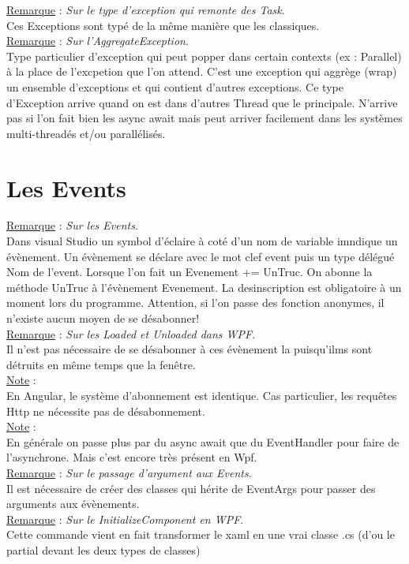 \documentclass[a4paper,12pt,twoside]{article}
\newcommand{\incode}[1]{{\footnotesize\ttfamily #1}} %
\newcommand{\rem}[2]{\noindent\underline{Remarque} : \textit{#1}.\\ \indent #2}
\newcommand{\note}[1]{\noindent\underline{Note} : \\ \indent #1}
\begin{document}
\rem{Sur le type d'exception qui remonte des Task}{Ces Exceptions sont typé de la même manière que les classiques.}\\

\rem{Sur l'\incode{AggregateException}}{Type particulier d'exception qui peut popper dans certain contexts (ex : Parallel) à la place de l'excpetion que l'on attend. C'est une exception qui aggrège (wrap) un ensemble d'exceptions et qui contient d'autres exceptions. Ce type d'Exception arrive quand on est dans d'autres Thread que le principale. N'arrive pas si l'on fait bien les async await mais peut arriver facilement dans les systèmes multi-threadés et/ou parallélisés.}\\

\section{Les Events}

\rem{Sur les Events}{Dans visual Studio un symbol d'éclaire à coté d'un nom de variable imndique un évènement. Un évènement se déclare avec le mot clef \incode{event} puis un type délégué Nom de l'event. Lorsque l'on fait un \incode{Evenement += UnTruc}. On abonne la méthode \incode{UnTruc} à l'évènement \incode{Evenement}. La desinscription est obligatoire à un moment lors du programme. Attention, si l'on passe des fonction anonymes, il n'existe aucun moyen de se désabonner!}\\

\rem{Sur les \incode{Loaded} et \incode{Unloaded} dans WPF}{Il n'est pas nécessaire de se désabonner à ces évènement la puisqu'ilms sont détruits en même temps que la fenêtre.}\\

\note{En Angular, le système d'abonnement est identique. Cas particulier, les requêtes Http ne nécessite pas de désabonnement.}\\

\note{En générale on passe plus par du \incode{async await} que du \incode{EventHandler} pour faire de l'asynchrone. Mais c'est encore très présent en Wpf.}\\

\rem{Sur le passage d'argument aux Events}{Il est nécessaire de créer des classes qui hérite de \incode{EventArgs} pour passer des arguments aux évènements.}\\

\rem{Sur le \incode{InitializeComponent} en WPF}{Cette commande vient en fait transformer le xaml en une vrai classe .cs (d'ou le \incode{partial} devant les deux types de classes)}\\
\end{document}
